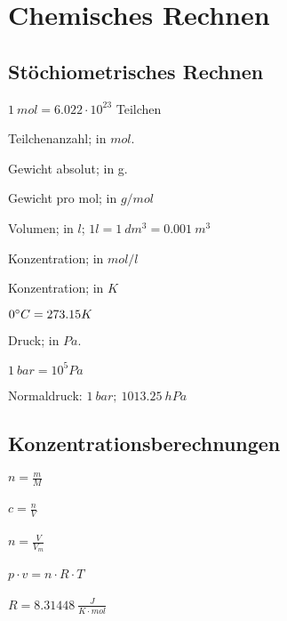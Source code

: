 \section{Chemisches Rechnen}

\subsection{Stöchiometrisches Rechnen}

\begin{definition}[mol]
	$1 \ mol = 6.022 \cdot 10^{23}$ Teilchen
\end{definition}

\begin{definition}[n]
	Teilchenanzahl; in $mol$.
\end{definition}

\begin{definition}[m]
	Gewicht absolut; in g.
\end{definition}

\begin{definition}[M]
	Gewicht pro mol; in $g/mol$
\end{definition}

\begin{definition}[V]
	Volumen; in	$l$; $1l=1\ dm^3=0.001\ m^3$
\end{definition}

\begin{definition}[c]
	Konzentration; in $mol/l$
\end{definition}

\begin{definition}[T]
	Konzentration; in $K$
	
	$0\degree C = 273.15K$
\end{definition}

\begin{definition}[p]
	Druck; in $Pa$.
	
	$1\ bar = 10^5 Pa$
	
	Normaldruck: $1\ bar;\ 1013.25\ hPa$
\end{definition}


\subsection{Konzentrationsberechnungen}

{\large
	$n=\frac{m}{M}$
	\\ \\
	$c=\frac{n}{V}$
	\\ \\
	$n = \frac{V}{V_m}$
	\\ \\
	$ p \cdot v = n \cdot R \cdot T $
	\\ \\
	$R = 8.31448 \ \frac{J}{K \cdot mol}$
}